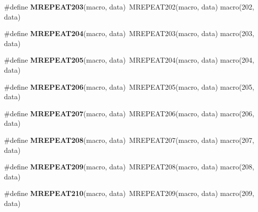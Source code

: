 \begin{DoxyCompactItemize}
\item 
\hypertarget{group__group__xmega__utils__mrepeat_ga017ff6b502ad948e0419894957597258}{\#define {\bfseries M\-R\-E\-P\-E\-A\-T203}(macro, data)~M\-R\-E\-P\-E\-A\-T202(macro, data)   macro(202, data)}\label{group__group__xmega__utils__mrepeat_ga017ff6b502ad948e0419894957597258}

\item 
\hypertarget{group__group__xmega__utils__mrepeat_ga0e339097dee89fd4eaf9885f32db1c16}{\#define {\bfseries M\-R\-E\-P\-E\-A\-T204}(macro, data)~M\-R\-E\-P\-E\-A\-T203(macro, data)   macro(203, data)}\label{group__group__xmega__utils__mrepeat_ga0e339097dee89fd4eaf9885f32db1c16}

\item 
\hypertarget{group__group__xmega__utils__mrepeat_gae672303fe7f3ba300d061715db22723f}{\#define {\bfseries M\-R\-E\-P\-E\-A\-T205}(macro, data)~M\-R\-E\-P\-E\-A\-T204(macro, data)   macro(204, data)}\label{group__group__xmega__utils__mrepeat_gae672303fe7f3ba300d061715db22723f}

\item 
\hypertarget{group__group__xmega__utils__mrepeat_ga899fa83ef3f1e32c26c7decdb29e5747}{\#define {\bfseries M\-R\-E\-P\-E\-A\-T206}(macro, data)~M\-R\-E\-P\-E\-A\-T205(macro, data)   macro(205, data)}\label{group__group__xmega__utils__mrepeat_ga899fa83ef3f1e32c26c7decdb29e5747}

\item 
\hypertarget{group__group__xmega__utils__mrepeat_ga3f4ed7437c340ec027580d80fdbfc353}{\#define {\bfseries M\-R\-E\-P\-E\-A\-T207}(macro, data)~M\-R\-E\-P\-E\-A\-T206(macro, data)   macro(206, data)}\label{group__group__xmega__utils__mrepeat_ga3f4ed7437c340ec027580d80fdbfc353}

\item 
\hypertarget{group__group__xmega__utils__mrepeat_ga376e9d40a620958fa73305665ad13e5d}{\#define {\bfseries M\-R\-E\-P\-E\-A\-T208}(macro, data)~M\-R\-E\-P\-E\-A\-T207(macro, data)   macro(207, data)}\label{group__group__xmega__utils__mrepeat_ga376e9d40a620958fa73305665ad13e5d}

\item 
\hypertarget{group__group__xmega__utils__mrepeat_ga6febba153ad3a3ea0ddd84b95ddded40}{\#define {\bfseries M\-R\-E\-P\-E\-A\-T209}(macro, data)~M\-R\-E\-P\-E\-A\-T208(macro, data)   macro(208, data)}\label{group__group__xmega__utils__mrepeat_ga6febba153ad3a3ea0ddd84b95ddded40}

\item 
\hypertarget{group__group__xmega__utils__mrepeat_ga888280894db1adc77f3524c72d226bc3}{\#define {\bfseries M\-R\-E\-P\-E\-A\-T210}(macro, data)~M\-R\-E\-P\-E\-A\-T209(macro, data)   macro(209, data)}\label{group__group__xmega__utils__mrepeat_ga888280894db1adc77f3524c72d226bc3}


\end{DoxyCompactItemize}
